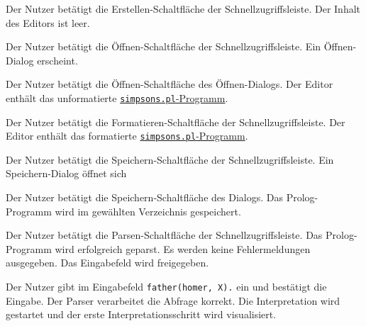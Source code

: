 \documentclass[parskip=full,11pt,twoside]{scrartcl}
\begin{document}

{Der Nutzer betätigt die Erstellen-Schaltfläche der Schnellzugriffsleiste.}
{Der Inhalt des Editors ist leer.}

{Der Nutzer betätigt die Öffnen-Schaltfläche der Schnellzugriffsleiste.}
{Ein Öffnen-Dialog erscheint.}

{Der Nutzer betätigt die Öffnen-Schaltfläche des Öffnen-Dialogs.}
{Der Editor enthält das unformatierte \hyperref[appendix:simpsons]{\texttt{simpsons.pl}-Programm}.}

{Der Nutzer betätigt die Formatieren-Schaltfläche der Schnellzugriffsleiste.}
{Der Editor enthält das formatierte \hyperref[appendix:simpsons]{\texttt{simpsons.pl}-Programm}.}

{Der Nutzer betätigt die Speichern-Schaltfläche der Schnellzugriffsleiste.}
{Ein Speichern-Dialog öffnet sich}

{Der Nutzer betätigt die Speichern-Schaltfläche des Dialogs.}
{Das Prolog-Programm wird im gewählten Verzeichnis gespeichert.}

{Der Nutzer betätigt die Parsen-Schaltfläche der Schnellzugriffsleiste.}
{Das Prolog-Programm wird erfolgreich geparst. Es werden keine Fehlermeldungen ausgegeben. Das Eingabefeld wird freigegeben.}

{Der Nutzer gibt im Eingabefeld \texttt{father(homer, X).} ein und bestätigt die Eingabe.}
{Der Parser verarbeitet die Abfrage korrekt. Die Interpretation wird gestartet und der erste Interpretationsschritt wird visualisiert.}
\end{document}
